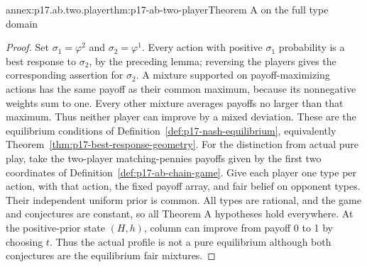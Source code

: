 \begin{annexitem}{annex:p17.ab.two.player}{thm:p17-ab-two-player}{Theorem A on the full type domain}
\begin{proof}
Set \(\sigma_1=\varphi^2\) and \(\sigma_2=\varphi^1\).
Every action with positive \(\sigma_1\) probability is a best
response to \(\sigma_2\), by the preceding lemma; reversing the
players gives the corresponding assertion for \(\sigma_2\).
A mixture supported on payoff-maximizing actions has the same
payoff as their common maximum, because its nonnegative weights
sum to one. Every other mixture averages payoffs no larger
than that maximum. Thus neither player can improve by a mixed
deviation. These are the equilibrium conditions of
Definition~\ref{def:p17-nash-equilibrium}, equivalently
Theorem~\ref{thm:p17-best-response-geometry}.
For the distinction from actual pure play, take the two-player
matching-pennies payoffs given by the first two coordinates of
Definition~\ref{def:p17-ab-chain-game}. Give each player one type
per action, with that action, the fixed payoff array, and fair
belief on opponent types. Their independent uniform prior is
common. All types are rational, and the game and conjectures
are constant, so all Theorem A hypotheses hold everywhere.
At the positive-prior state \((H,h)\), column can improve from
payoff 0 to 1 by choosing \(t\). Thus the actual profile is
not a pure equilibrium although both conjectures are the
equilibrium fair mixtures.
\end{proof}
\end{annexitem}

